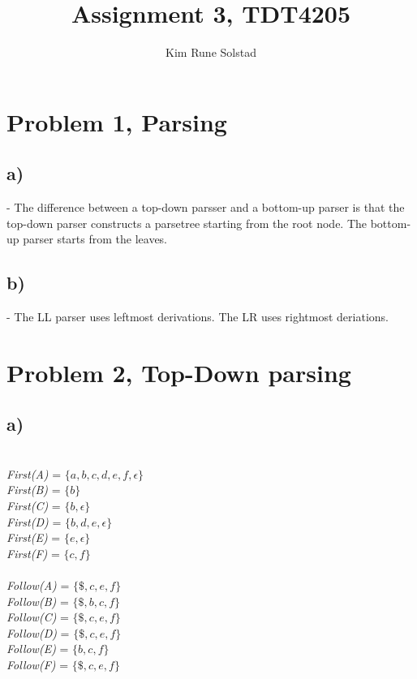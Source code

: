 \documentclass[a4paper, utf8]{article}
\author{Kim Rune Solstad}
\title{Assignment 3, TDT4205}
\begin{document}
\maketitle
\section*{Problem 1, Parsing}
\subsection*{a)} - The difference between a top-down parsser and a bottom-up parser is that the top-down parser constructs a parsetree starting from the root node. The bottom-up parser starts from the leaves.\\
\subsection*{b)} - The LL parser uses leftmost derivations. The LR uses rightmost deriations. 
\section*{Problem 2, Top-Down parsing}
\subsection*{a)} \\
\emph{First(A)} = $\{a, b, c, d, e, f, \epsilon\}$ \\
\emph{First(B)} = $\{b\}$ \\
\emph{First(C)} = $\{b, \epsilon\}$ \\
\emph{First(D)} = $\{b, d, e, \epsilon\}$ \\
\emph{First(E)} = $\{e, \epsilon \}$ \\
\emph{First(F)} = $\{c, f\}$ \\
\\
\emph{Follow(A)} = $\{\$, c, e, f\}$ \\
\emph{Follow(B)} = $\{\$, b, c, f\}$ \\
\emph{Follow(C)} = $\{\$, c, e, f\}$ \\
\emph{Follow(D)} = $\{\$, c, e, f\}$ \\
\emph{Follow(E)} = $\{b, c, f\}$ \\
\emph{Follow(F)} = $\{\$, c, e, f\}$ \\
\end{document}
